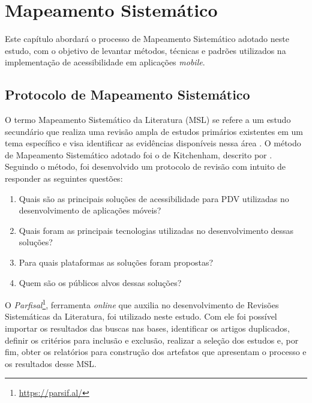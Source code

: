 \chapter{Mapeamento Sistemático}
Este capítulo abordará o processo de Mapeamento Sistemático adotado neste estudo, com o objetivo de levantar métodos, técnicas e padrões utilizados na implementação de acessibilidade em aplicações \emph{mobile}.


\section{Protocolo de Mapeamento Sistemático}
O termo Mapeamento Sistemático da Literatura (MSL) se refere a um estudo secundário que realiza uma revisão ampla
de estudos primários existentes em um tema específico e visa identificar as evidências disponíveis nessa área \cite{Kitchenham2007}.
O método de Mapeamento Sistemático adotado foi o de Kitchenham, descrito por .
Seguindo o método, foi desenvolvido um protocolo de revisão com intuito de responder as seguintes questões:
\begin{enumerate}
  \item Quais são as principais soluções de acessibilidade para PDV utilizadas no desenvolvimento de aplicações móveis?
  \item Quais foram as principais tecnologias utilizadas no desenvolvimento dessas soluções?
  \item Para quais plataformas as soluções foram propostas?
  \item Quem são os públicos alvos dessas soluções?
\end{enumerate}

O \emph{Parfisal}\footnote{\url{https://parsif.al/}}, ferramenta \emph{online} que auxilia no desenvolvimento de Revisões Sistemáticas da Literatura, foi utilizado neste estudo.
Com ele foi possível importar os resultados das buscas nas bases, identificar os artigos duplicados, definir os critérios para inclusão e exclusão, realizar a seleção dos estudos e, por fim, obter os relatórios para construção dos artefatos que apresentam o processo e os resultados desse MSL.


